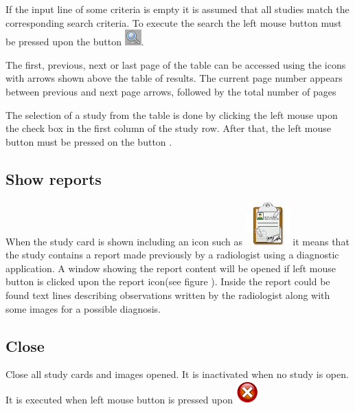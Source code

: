 \documentclass{plantilla-manual-usuario-en}
\begin{document}
If the input line of some criteria is empty it is assumed that all studies match the corresponding search criteria. To execute the search the left mouse button must be pressed upon the button \includegraphics[scale=0.5]{images/buscar.png}.

The first, previous, next or last page of the table can be accessed 
using the icons with arrows shown above the table of results. 
The current page number appears between previous and next page arrows, followed by the total number of pages

The selection of a study from the table is done by clicking the left mouse upon the check box in the first column of the study row. After that, the left mouse button must be pressed on the button .
\subsection{Show reports}

When the study card is shown including an icon such as \includegraphics[scale=0.3]{images/report-icon.jpeg} it means that the study contains a report made previously by a radiologist using a diagnostic application. A window showing the report content will be opened if left mouse button is clicked upon the report icon(see figure ). Inside the report could be found text lines describing observations written by the radiologist along with some images for a possible diagnosis.


\subsection{Close}

Close all study cards and images opened. It is inactivated when no study is open. It is executed when left mouse button is pressed upon \includegraphics[scale=0.5]{images/close.png}
\end{document}
